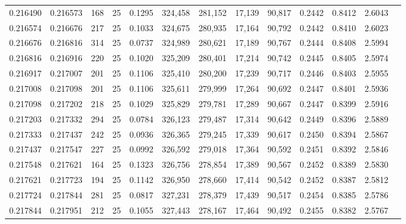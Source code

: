 \begin{tabular}{rrrrrrrrrrrrr}
0.216490 & 0.216573 &   168 &  25 &                                     0.1295 & 324,458 & 281,152 &  17,139 &  90,817 & 0.2442 & 0.8412 & 2.6043 \\
0.216574 & 0.216676 &   217 &  25 &                                     0.1033 & 324,675 & 280,935 &  17,164 &  90,792 & 0.2442 & 0.8410 & 2.6023 \\
0.216676 & 0.216816 &   314 &  25 &                                     0.0737 & 324,989 & 280,621 &  17,189 &  90,767 & 0.2444 & 0.8408 & 2.5994 \\
0.216816 & 0.216916 &   220 &  25 &                                     0.1020 & 325,209 & 280,401 &  17,214 &  90,742 & 0.2445 & 0.8405 & 2.5974 \\
0.216917 & 0.217007 &   201 &  25 &                                     0.1106 & 325,410 & 280,200 &  17,239 &  90,717 & 0.2446 & 0.8403 & 2.5955 \\
0.217008 & 0.217098 &   201 &  25 &                                     0.1106 & 325,611 & 279,999 &  17,264 &  90,692 & 0.2447 & 0.8401 & 2.5936 \\
0.217098 & 0.217202 &   218 &  25 &                                     0.1029 & 325,829 & 279,781 &  17,289 &  90,667 & 0.2447 & 0.8399 & 2.5916 \\
0.217203 & 0.217332 &   294 &  25 &                                     0.0784 & 326,123 & 279,487 &  17,314 &  90,642 & 0.2449 & 0.8396 & 2.5889 \\
0.217333 & 0.217437 &   242 &  25 &                                     0.0936 & 326,365 & 279,245 &  17,339 &  90,617 & 0.2450 & 0.8394 & 2.5867 \\
0.217437 & 0.217547 &   227 &  25 &                                     0.0992 & 326,592 & 279,018 &  17,364 &  90,592 & 0.2451 & 0.8392 & 2.5846 \\
0.217548 & 0.217621 &   164 &  25 &                                     0.1323 & 326,756 & 278,854 &  17,389 &  90,567 & 0.2452 & 0.8389 & 2.5830 \\
0.217621 & 0.217723 &   194 &  25 &                                     0.1142 & 326,950 & 278,660 &  17,414 &  90,542 & 0.2452 & 0.8387 & 2.5812 \\
0.217724 & 0.217844 &   281 &  25 &                                     0.0817 & 327,231 & 278,379 &  17,439 &  90,517 & 0.2454 & 0.8385 & 2.5786 \\
0.217844 & 0.217951 &   212 &  25 &                                     0.1055 & 327,443 & 278,167 &  17,464 &  90,492 & 0.2455 & 0.8382 & 2.5767 \\

\end{tabular}
